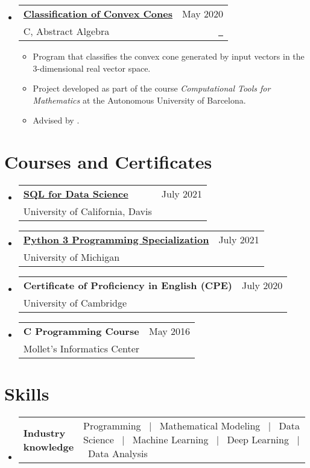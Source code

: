 \documentclass[a4paper,11pt]{article}
\makeatletter
\newcommand{\resumeItemListEnd}{\end{itemize}}
\newcommand{\resumeSectionTypeOne}[2]{
  \item\begin{tabular*}{0.99\textwidth}[t]{
    p{0.18\linewidth}p{0.81\linewidth}
  }
  \textbf{#1} & #2
  \end{tabular*}\vspace{-2pt}
}
\newcommand{\resumeQuadHeading}[4]{
  \item
  \begin{tabular*}{0.96\textwidth}[t]{l@{\extracolsep{\fill}}r}
    \textbf{#1} & \small #2 \\
    \small#3 & \small #4 \\
  \end{tabular*}
}
\newcommand{\resumeHeadingListStart}{
  \begin{itemize}[leftmargin=0.15in, label={}]
}
\newcommand{\resumeHeadingListEnd}{\end{itemize}}
\makeatother
\begin{document}
  \resumeHeadingListStart{}
    \resumeQuadHeading{\href{https://github.com/loredanasandu/cone-classification}{Classification of Convex Cones}}{May 2020}{C, Abstract Algebra}{\href{https://github.com/loredanasandu/cone-classification}{\faGithub \ \graydotuline{Source code}}}
    \begin{itemize}[leftmargin=3em, itemsep=0.1em, topsep=2pt]
      \item \small Program that classifies the convex cone generated by input vectors in the 3-dimensional real vector space.
      \item \small Project developed as part of the course \textit{Computational Tools for Mathematics} at the Autonomous University of Barcelona.
      \item \small Advised by \href{https://mat.uab.cat/geoarit/index.php/people?controller=member&view=member&id=1}{}.
    \end{itemize}
  \resumeItemListEnd{}



\section{Courses and Certificates}
  \resumeHeadingListStart{}
    \resumeQuadHeading{\href{https://www.coursera.org/account/accomplishments/verify/ZNTSZQQ9TLQK}{SQL for Data Science}}{July 2021}{University of California, Davis}{\ }
  \resumeHeadingListEnd{}

  \resumeHeadingListStart{}
    \resumeQuadHeading{\href{https://www.coursera.org/account/accomplishments/specialization/WMG73QR4GJLH}{Python 3 Programming Specialization}}{July 2021}{University of Michigan}{\ }
  \resumeHeadingListEnd{}

  \resumeHeadingListStart{}
    \resumeQuadHeading{Certificate of Proficiency in English (CPE)}{July 2020}{University of Cambridge}{\ }
  \resumeHeadingListEnd{}

  \resumeHeadingListStart{}
    \resumeQuadHeading{C Programming Course}{May 2016}{Mollet's Informatics Center}{\ }
  \resumeHeadingListEnd{}


\section{Skills}
  \resumeHeadingListStart{}
    \resumeSectionTypeOne{Industry knowledge}{Programming \ $|$ \ Mathematical Modeling \ $|$ \ Data Science \ $|$ \ Machine Learning \ $|$ \ Deep Learning \ $|$ \ Data Analysis}
  \resumeHeadingListEnd{}
\end{document}
